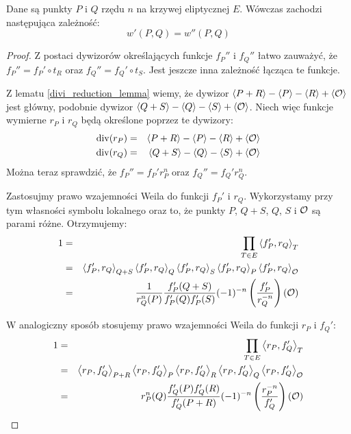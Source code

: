 \begin{theorem}
Dane są punkty $P$ i $Q$ rzędu $n$ na krzywej eliptycznej $E$.
Wówczas zachodzi następująca zależność:
\begin{equation}
w'(P, Q) = w''(P, Q)
\end{equation}
\end{theorem}

\begin{proof}
Z postaci dywizorów określających funkcje $f_P''$ i $f_Q''$
łatwo zauważyć, że $f_P'' = f_P' \circ t_R$ oraz $f_Q'' = f_Q' \circ t_S$.
Jest jeszcze inna zależność łącząca te funkcje.

\noindent
Z lematu \ref{divi_reduction_lemma} wiemy,
że dywizor $\left\langle P+R\right\rangle - \left\langle P\right\rangle - \left\langle R\right\rangle + \left\langle\mathcal{O}\right\rangle$ jest główny,
podobnie dywizor $\left\langle Q+S\right\rangle - \left\langle Q\right\rangle - \left\langle S\right\rangle + \left\langle\mathcal{O}\right\rangle$.
Niech więc funkcje wymierne $r_P$ i $r_Q$
będą określone poprzez te dywizory:
\begin{eqnarray*}
\operatorname{div}(r_P) & = & \left\langle P+R\right\rangle - \left\langle P\right\rangle - \left\langle R\right\rangle + \left\langle\mathcal{O}\right\rangle \\
\operatorname{div}(r_Q) & = & \left\langle Q+S\right\rangle - \left\langle Q\right\rangle - \left\langle S\right\rangle + \left\langle\mathcal{O}\right\rangle
\end{eqnarray*}
Można teraz sprawdzić,
że $f_P'' = f_P'r_P^n$ oraz $f_Q'' = f_Q'r_Q^n$.

\noindent
Zastosujmy prawo wzajemności Weila do funkcji $f_P'$ i $r_Q$.
Wykorzystamy przy tym własności symbolu lokalnego
oraz to, że punkty $P$, $Q+S$, $Q$, $S$ i $\mathcal{O}$ są parami różne.
Otrzymujemy:
\begin{eqnarray}
1
& = & \prod_{T \in E} \left\langle f_P' , r_Q \right\rangle_{T}
\nonumber \\
& = & \left\langle f_P' , r_Q \right\rangle_{Q+S}\left\langle f_P' , r_Q \right\rangle_{Q}      \left\langle f_P' , r_Q \right\rangle_{S}
      \left\langle f_P' , r_Q \right\rangle_{P}  \left\langle f_P' , r_Q \right\rangle_{\mathcal{O}}
\nonumber \\
\label{reciprocity_1_eqn}
& = & \frac{1}{r_Q^n(P)}\frac{f_P'(Q+S)}{f_P'(Q)f_P'(S)}
      (-1)^{-n}\left(\frac{f_P'}{r_Q^{-n}}\right)(\mathcal{O})
\end{eqnarray}

\noindent
W analogiczny sposób stosujemy prawo wzajemności Weila
do funkcji $r_P$ i $f_Q'$:
\begin{eqnarray}
1
& = & \prod_{T \in E} \left\langle r_P , f_Q' \right\rangle_{T}
\nonumber \\
& = & \left\langle r_P , f_Q' \right\rangle_{P+R}\left\langle r_P , f_Q' \right\rangle_{P}       \left\langle r_P , f_Q' \right\rangle_{R}
      \left\langle r_P , f_Q' \right\rangle_{Q}  \left\langle r_P , f_Q' \right\rangle_{\mathcal{O}}
\nonumber \\
\label{reciprocity_2_eqn}
& = & r_P^n(Q)\frac{f_Q'(P)f_Q'(R)}{f_Q'(P+R)}
      (-1)^{-n}\left(\frac{r_P^{-n}}{f_Q'}\right)(\mathcal{O})
\end{eqnarray}


\end{proof}
